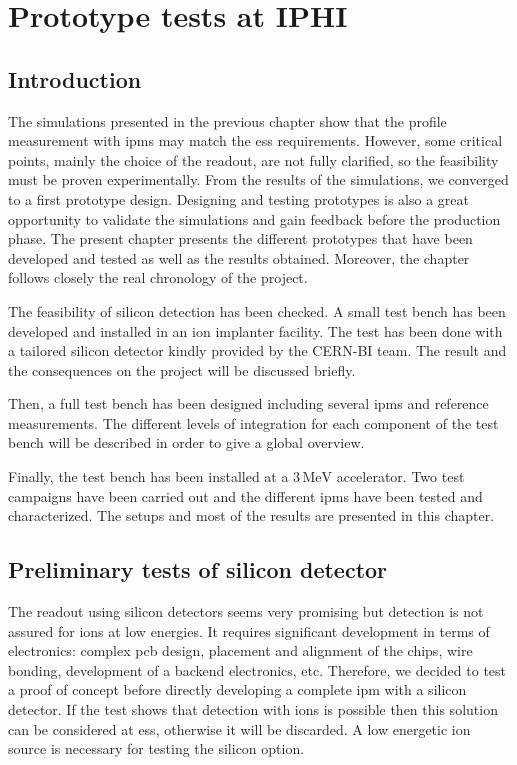 \chapter{Prototype tests at IPHI}
\cleardoublepage

\minitoc

\section{Introduction}
\begin{refsection}
  \label{ch4:Introduction}
  The simulations presented in the previous chapter show that the profile measurement with \acrshort{ipm}s may match the \acrshort{ess} requirements. However, some critical points, mainly the choice of the readout, are not fully clarified, so the feasibility must be proven experimentally. From the results of the simulations, we converged to a first prototype design. Designing and testing prototypes is also a great opportunity to validate the simulations and gain feedback before the production phase. The present chapter presents the different prototypes that have been developed and tested as well as the results obtained. Moreover, the chapter follows closely the real chronology of the project.

  The feasibility of silicon detection has been checked. A small test bench has been developed and installed in an ion implanter facility. The test has been done with a tailored silicon detector kindly provided by the CERN-BI team. The result and the consequences on the project will be discussed briefly.

  Then, a full test bench has been designed including several \acrshort{ipm}s and reference measurements. The different levels of integration for each component of the test bench will be described in order to give a global overview.

  Finally, the test bench has been installed at a $3\,\mathrm{MeV}$ accelerator. Two test campaigns have been carried out and the different \acrshort{ipm}s have been tested and characterized. The setups and most of the results are presented in this chapter.

  \section{Preliminary tests of silicon detector}
  The readout using silicon detectors seems very promising but detection is not assured for ions at low energies. It requires significant development in terms of electronics: complex \acrshort{pcb} design, placement and alignment of the chips, wire bonding, development of a backend electronics, etc. Therefore, we decided to test a proof of concept before directly developing a complete \acrshort{ipm} with a silicon detector. If the test shows that detection with ions is possible then this solution can be considered at \acrshort{ess}, otherwise it will be discarded. A low energetic ion source is necessary for testing the silicon option.


\end{refsection}
